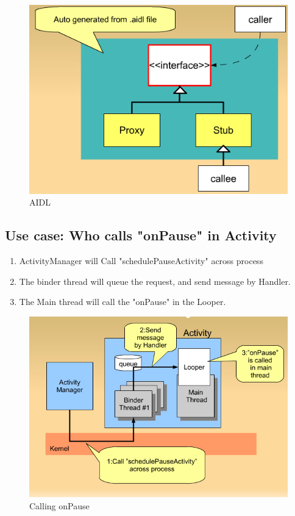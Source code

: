 \documentclass[11pt, a4paper]{book}
\begin{document}
\begin{figure}
    \centering
    \includegraphics[scale=0.5]{AIDL.png}
    \caption{AIDL}
\end{figure}
\subsection{Use case: Who calls "onPause" in Activity}
\begin{enumerate}
    \item ActivityManager will Call "schedulePauseActivity" across process
    \item The binder thread will queue the request, and send message by Handler.
    \item The Main thread will call the "onPause" in the Looper.
\end{enumerate}
\begin{figure}
    \centering
    \includegraphics[scale=0.5]{onPauseCall.png}
    \caption{Calling onPause}
\end{figure}
\end{document}
